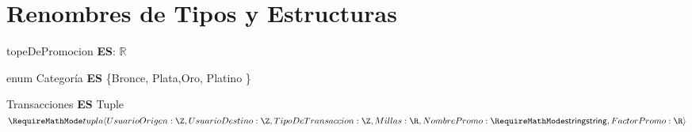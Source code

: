 \documentclass[11pt,a4paper]{article}
\newcommand{\Tipo}[1]{\mathsf{#1}}
\begin{document}
\section{Renombres de Tipos y Estructuras}


\noindent topeDePromocion \textbf{ES}: $\mathbb{R}$

\noindent enum Categoría \textbf{ES} \{Bronce, Plata,Oro, Platino  \}

\vspace{0.5cm}

\noindent Transacciones \textbf{ES} Tuple $\tupla{
	UsuarioOrigen: \Tipo{\Z}, \\
	UsuarioDestino: \Tipo{\Z},
	TipoDeTransaccion: \Tipo{\Z},
	Millas: \Tipo{\R}, \\
	NombrePromo: \Tipo{\str},
	FactorPromo: \Tipo{\R}
	}$

\noindent {}
\end{document}
